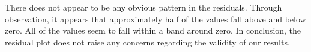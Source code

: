 \begin{example}
\begin{benumerate}
There does not appear to be any obvious pattern in the residuals. Through observation, it appears that approximately half of the values fall above and below zero. All of the values seem to fall within a band around zero. In conclusion, the residual plot does not raise any concerns regarding the validity of our results. 
\end{benumerate}
\end{example}
%
%
%
